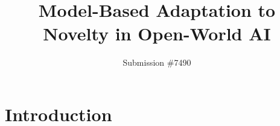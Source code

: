 \documentclass[sigconf]{aamas}
\title{Model-Based Adaptation to Novelty in Open-World AI}
\author{Submission \#7490} %
\begin{document}

\pagestyle{fancy}
\fancyhead{}


\maketitle 



\section{Introduction} 





\end{document}
